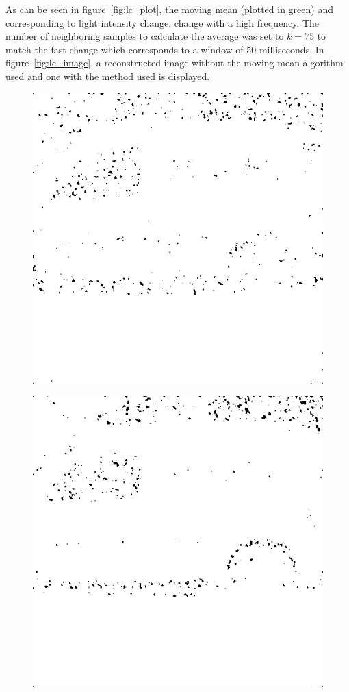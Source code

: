 As can be seen in figure~\ref{fig:lc_plot}, the moving mean (plotted in green) and corresponding to light intensity change, change with a high frequency. The number of neighboring samples to calculate the average was set to $k=75$ to match the fast change which corresponds to a window of 50 milliseconds. In figure~\ref{fig:lc_image}, a reconstructed image without the moving mean algorithm used and one with the method used is displayed.

\begin{figure}[H]
\begin{minipage}[t]{0.49\textwidth}
\includegraphics[width = 1\linewidth]{result/luminance/24_512_m30.PNG}
	\subcaption{}
	\label{lc_bf}
\end{minipage}
\begin{minipage}[t]{0.49\textwidth}
\includegraphics[width = 1\linewidth]{gfx/car/car_m30.png}

\end{minipage}
\end{figure}
